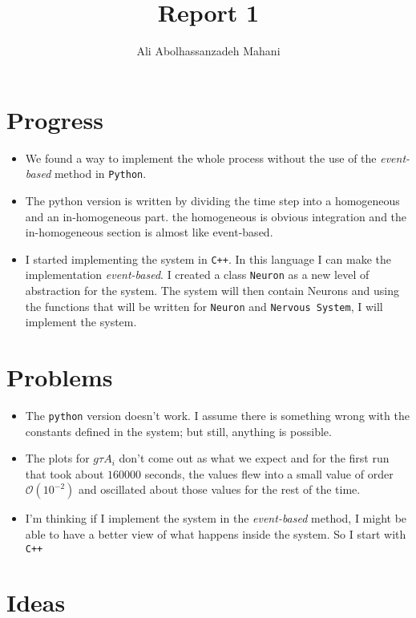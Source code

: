 \documentclass[a4paper, 12pt]{article}
\title{Report 1}
\author{Ali Abolhassanzadeh Mahani}
\begin{document}
	\section{Progress}
	\begin{itemize}
		\item We found a way to implement the whole process without the use of 
		the \textit{event-based} method in \texttt{Python}.
		
		\item The python version is written by dividing the time step into a homogeneous 
		and an in-homogeneous part. the homogeneous is obvious integration and 
		the in-homogeneous section is almost like event-based. 
		
		\item I started implementing the system in \texttt{C++}. In this language I can
		make the implementation \textit{event-based}. 
		I created a class \texttt{Neuron} as a new level of abstraction for the system.
		The system will then contain Neurons and using the functions that will be written
		for \texttt{Neuron} and \texttt{Nervous System}, I will implement the system.
	\end{itemize}

	\section{Problems}
	\begin{itemize}
		\item The \texttt{python} version doesn't work. I assume there is something
		wrong with the constants defined in the system; but still, anything is possible.
		
		\item The plots for $g\tau A_{i}$ don't come out as what we expect and for 
		the first run that took about $160000$ seconds, the values flew into a small 
		value of order $\mathcal{O}(10^{-2})$ and oscillated about those values for
		the rest of the time.
	\end{itemize}
	\begin{itemize}
		\item I'm thinking if I implement the system in the \textit{event-based} method,
		I might be able to have a better view of what happens inside the system. So I start 
		with \texttt{C++}
	\end{itemize}

	\section{Ideas}
	
\end{document}
